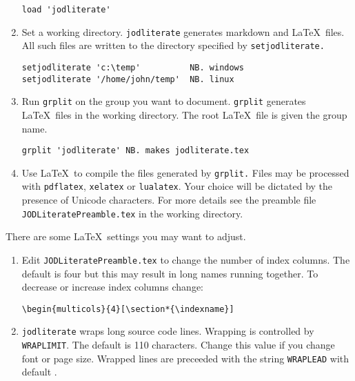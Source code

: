 \begin{enumerate}[1.]
\begin{verbatim}
load 'jodliterate'
\end{verbatim}
\item
  Set a working directory. \texttt{jodliterate} generates markdown and
  \LaTeX~files. All such files are written to the directory specified by
  \texttt{setjodliterate.}

\begin{verbatim}
setjodliterate 'c:\temp'          NB. windows
setjodliterate '/home/john/temp'  NB. linux
\end{verbatim}
\item
  Run \texttt{grplit} on the group you want to document. \texttt{grplit}
  generates \LaTeX~files in the working directory. The root \LaTeX~file
  is given the group name.

\begin{verbatim}
grplit 'jodliterate' NB. makes jodliterate.tex 
\end{verbatim}
\item
  Use \LaTeX~to compile the files generated by \texttt{grplit.} Files
  may be processed with \texttt{pdflatex}, \texttt{xelatex} or
  \texttt{lualatex}. Your choice will be dictated by the presence of
  Unicode characters. For more details see the preamble file
  \texttt{JODLiteratePreamble.tex} in the working directory.
\end{enumerate}

There are some \LaTeX~settings you may want to adjust.

\begin{enumerate}[1.]
\item
  Edit \texttt{JODLiteratePreamble.tex} to change the number of index
  columns. The default is four but this may result in long names running
  together. To decrease or increase index columns change:

\begin{verbatim}
\begin{multicols}{4}[\section*{\indexname}]
\end{verbatim}
\item
  \texttt{jodliterate} wraps long source code lines. Wrapping is
  controlled by \texttt{WRAPLIMIT}. The default is 110 characters.
  Change this value if you change font or page size. Wrapped lines are
  preceeded with the string \texttt{WRAPLEAD} with default
  .
\end{enumerate}
